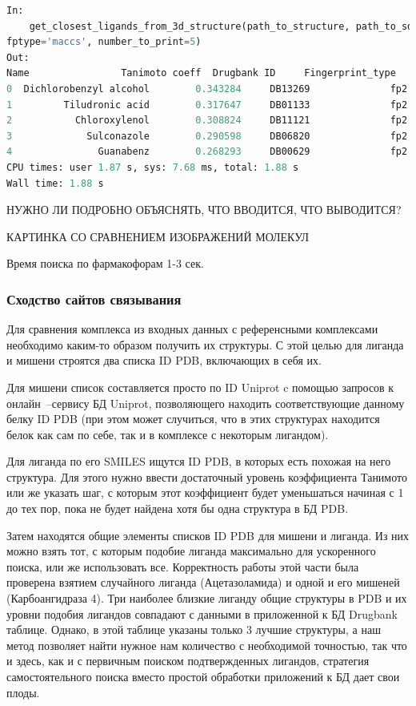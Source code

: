 \documentclass[a4paper,14pt]{article}         %
\begin{document}
\begin{lstlisting}[language=Python, label={lst:sdf-fing}, caption={Сходство лигандов по топологическим молекулярным отпечаткам с помощью ПМ Open Babel для входных данных~--- SDF структуры молекулы.}]
In: 
	get_closest_ligands_from_3d_structure(path_to_structure, path_to_sdf_approved, root,
fptype='maccs', number_to_print=5)
Out:
Name  				Tanimoto coeff 	Drugbank ID 	Fingerprint_type
0  Dichlorobenzyl alcohol        0.343284     DB13269              fp2
1         Tiludronic acid        0.317647     DB01133              fp2
2           Chloroxylenol        0.308824     DB11121              fp2
3             Sulconazole        0.290598     DB06820              fp2
4               Guanabenz        0.268293     DB00629              fp2
CPU times: user 1.87 s, sys: 7.68 ms, total: 1.88 s
Wall time: 1.88 s
\end{lstlisting}
\color{orange} НУЖНО ЛИ ПОДРОБНО ОБЪЯСНЯТЬ, ЧТО ВВОДИТСЯ, ЧТО ВЫВОДИТСЯ?
\color{black}

\color{orange} КАРТИНКА СО СРАВНЕНИЕМ ИЗОБРАЖЕНИЙ МОЛЕКУЛ
\color{black}

Время поиска по фармакофорам 1-3 сек.
\subsubsection{Сходство сайтов связывания}
Для сравнения комплекса из входных данных с референсными комплексами необходимо каким-то образом получить их структуры. С этой целью для лиганда и мишени строятся два списка ID PDB, включающих в себя их. 

Для мишени список составляется просто по ID Uniprot c помощью запросов к онлайн~--сервису БД Uniprot, позволяющего находить соответствующие данному белку ID PDB (при этом может случиться, что в этих структурах находится белок как сам по себе, так и в комплексе с некоторым лигандом). 

Для лиганда по его SMILES ищутся ID PDB, в которых есть похожая на него структура. Для этого нужно ввести достаточный уровень коэффициента Танимото или же указать шаг, с которым этот коэффициент будет уменьшаться начиная с 1 до тех пор, пока не будет найдена хотя бы одна структура в БД PDB.

Затем находятся общие элементы списков ID PDB для мишени и лиганда. Из них можно взять тот, с которым подобие лиганда максимально для ускоренного поиска, или же использовать все. Корректность работы этой части была проверена взятием случайного лиганда (Ацетазоламида) и одной и его мишеней (Карбоангидраза 4). Три наиболее близкие лиганду общие структуры в PDB и их уровни подобия лигандов совпадают с данными в приложенной к БД Drugbank таблице. Однако, в этой таблице указаны только 3 лучшие структуры, а наш метод позволяет найти нужное нам количество с необходимой точностью, так что и здесь, как и с первичным поиском подтвержденных лигандов, стратегия самостоятельного поиска вместо простой обработки приложений к БД дает свои плоды.
\end{document}
